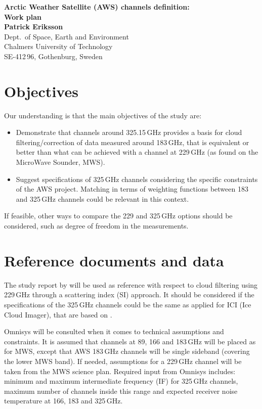 \documentclass[BCOR=1cm,12pt,bibliography=totoc]{article}
\begin{document}
\noindent
\textbf{{\Large Arctic Weather Satellite (AWS) channels definition:\\Work plan}}  \vspace{5mm}\\
{\bf Patrick Eriksson}\\
Dept.\ of Space, Earth and Environment\\
Chalmers University of Technology\\
SE-412\,96, Gothenburg, Sweden \vspace{10mm}


\section{Objectives}
\label{sec:objectives}
%
Our understanding is that the main objectives of the study are:
\begin{itemize}
\item Demonstrate that channels around 325.15\,GHz provides a basis for cloud
  filtering/correction of data measured around 183\,GHz, that is equivalent
  or better than what can be achieved with a channel at 229\,GHz (as found on
  the MicroWave Sounder, MWS). 
\item Suggest specifications of 325\,GHz channels considering the specific
  constraints of the AWS project. Matching in terms of weighting functions between
  183 and 325\,GHz channels could be relevant in this context.
\end{itemize}
If feasible, other ways to compare the 229 and 325\,GHz options should be
considered, such as degree of freedom in the measurements.


\section{Reference documents and data}
\label{sec:info}
%
The study report by \citet{rekha2012potential} will be used as reference with
respect to cloud filtering using 229\,GHz through a scattering index (SI)
approach. It should be considered if the specifications of the 325\,GHz
channels could be the same as applied for ICI (Ice Cloud Imager), that are
based on \citet{buehler:obser:12}.

Omnisys will be consulted when it comes to technical assumptions and
constraints. It is assumed that channels at 89, 166 and 183\,GHz will be placed
as for MWS, except that AWS 183\,GHz channels will be single sideband (covering
the lower MWS band). If needed, assumptions for a 229\,GHz channel will be
taken from the MWS science plan. Required input from Omnisys includes: minimum
and maximum intermediate frequency (IF) for 325\,GHz channels, maximum number
of channels inside this range and expected receiver noise temperature at 166,
183 and 325\,GHz.
\end{document}
